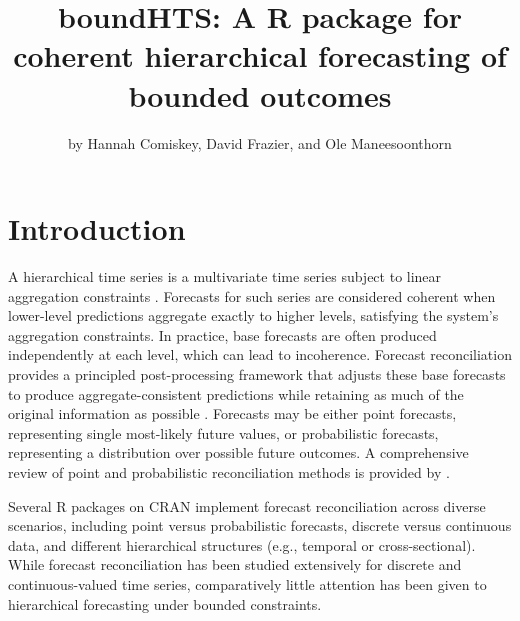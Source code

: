 \title{boundHTS: A R package for coherent hierarchical forecasting of bounded outcomes}


\author{by Hannah Comiskey, David Frazier, and Ole Maneesoonthorn}

\maketitle


\section{Introduction}\label{introduction}

A hierarchical time series is a multivariate time series subject to linear aggregation constraints \citep{Hyndman2022}. Forecasts for such series are considered coherent when lower-level predictions aggregate exactly to higher levels, satisfying the system's aggregation constraints. In practice, base forecasts are often produced independently at each level, which can lead to incoherence. Forecast reconciliation provides a principled post-processing framework that adjusts these base forecasts to produce aggregate-consistent predictions while retaining as much of the original information as possible \citep{Hyndman2021}. Forecasts may be either point forecasts, representing single most-likely future values, or probabilistic forecasts, representing a distribution over possible future outcomes. A comprehensive review of point and probabilistic reconciliation methods is provided by \citet{Athanasopoulos2024}.

Several R packages on CRAN implement forecast reconciliation across diverse scenarios, including point versus probabilistic forecasts, discrete versus continuous data, and different hierarchical structures (e.g., temporal or cross-sectional). While forecast reconciliation has been studied extensively for discrete and continuous-valued time series, comparatively little attention has been given to hierarchical forecasting under bounded constraints.

